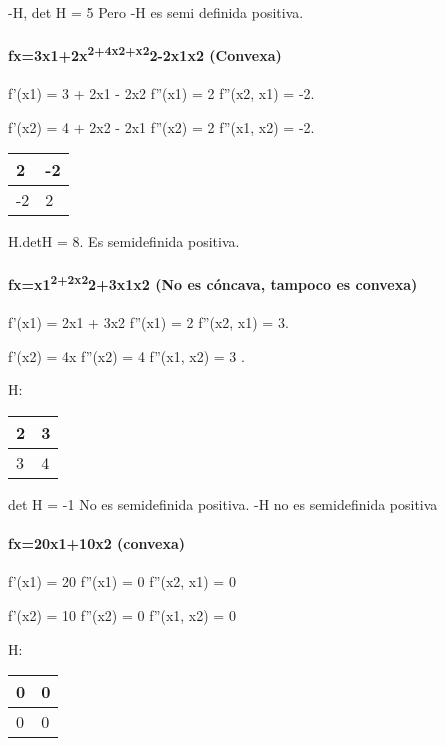\documentclass[11pt]{article}
\begin{document}
-H, det H = 5 Pero -H es semi definida positiva.

\paragraph{\texorpdfstring{fx=3x1+2x\textsuperscript{2+4x2+x2}2-2x1x2
(Convexa)}{fx=3x1+2x2+4x2+x22-2x1x2 (Convexa)}}\label{fx3x12x24x2x22-2x1x2-convexa}

f'(x1) = 3 + 2x1 - 2x2 f''(x1) = 2 f''(x2, x1) = -2.

f'(x2) = 4 + 2x2 - 2x1 f''(x2) = 2 f''(x1, x2) = -2.

\begin{longtable}[]{@{}ll@{}}
\toprule
2 & -2\tabularnewline
\midrule
\endhead
-2 & 2\tabularnewline
\bottomrule
\end{longtable}

H.detH = 8. Es semidefinida positiva.

\paragraph{\texorpdfstring{fx=x1\textsuperscript{2+2x2}2+3x1x2 (No es
cóncava, tampoco es
convexa)}{fx=x12+2x22+3x1x2 (No es cóncava, tampoco es convexa)}}\label{fxx122x223x1x2-no-es-cuxf3ncava-tampoco-es-convexa}

f'(x1) = 2x1 + 3x2 f''(x1) = 2 f''(x2, x1) = 3.

f'(x2) = 4x f''(x2) = 4 f''(x1, x2) = 3 .

H:

\begin{longtable}[]{@{}ll@{}}
\toprule
2 & 3\tabularnewline
\midrule
\endhead
3 & 4\tabularnewline
\bottomrule
\end{longtable}

det H = -1 No es semidefinida positiva. -H no es semidefinida positiva

\paragraph{fx=20x1+10x2 (convexa)}\label{fx20x110x2-convexa}

f'(x1) = 20 f''(x1) = 0 f''(x2, x1) = 0

f'(x2) = 10 f''(x2) = 0 f''(x1, x2) = 0

H:

\begin{longtable}[]{@{}ll@{}}
\toprule
0 & 0\tabularnewline
\midrule
\endhead
0 & 0\tabularnewline
\bottomrule
\end{longtable}
\end{document}
